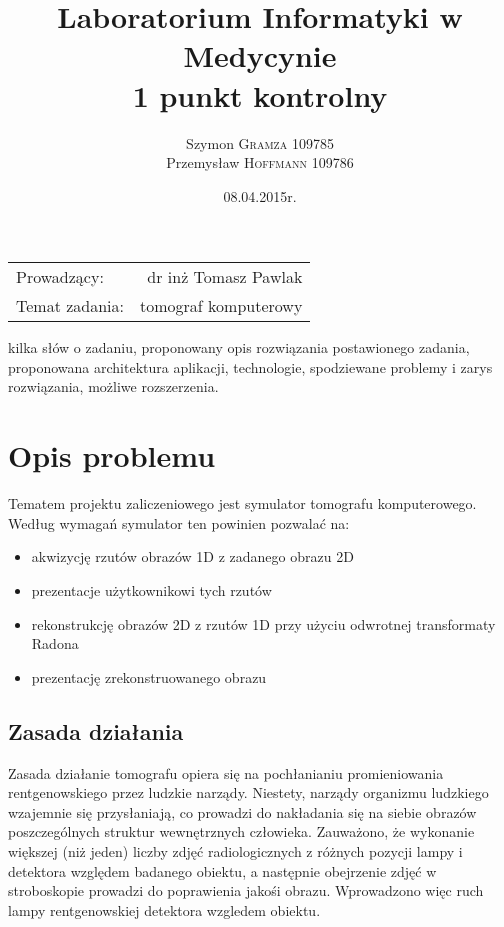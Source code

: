 \documentclass[A_4paper,12pt]{article}
\title{Laboratorium Informatyki w Medycynie \\ 1 punkt kontrolny} %
\author{Szymon \textsc{Gramza} 109785  \\ Przemysław \textsc{Hoffmann} 109786} %
\date{08.04.2015r.} %
\begin{document}
\maketitle %

\begin{center}
\begin{tabular}{l r}
Prowadzący: & dr inż Tomasz Pawlak \\
Temat zadania: & tomograf komputerowy
\end{tabular}
\end{center}

\newpage
 kilka słów o zadaniu, proponowany opis rozwiązania postawionego zadania, 
 proponowana architektura aplikacji, technologie, 
 spodziewane problemy i zarys rozwiązania, możliwe rozszerzenia.
 
\section{Opis problemu}
Tematem projektu zaliczeniowego jest symulator tomografu komputerowego.
Według wymagań symulator ten powinien pozwalać na:
\begin{itemize}
\item akwizycję rzutów obrazów 1D z zadanego obrazu 2D
\item prezentacje użytkownikowi tych rzutów
\item rekonstrukcję obrazów 2D z rzutów 1D przy użyciu odwrotnej transformaty Radona
\item prezentację zrekonstruowanego obrazu
\end{itemize}

\subsection{Zasada działania}
Zasada działanie tomografu opiera się na pochłanianiu promieniowania rentgenowskiego przez ludzkie narządy.
Niestety, narządy organizmu ludzkiego wzajemnie się przysłaniają, co prowadzi do nakładania się na siebie obrazów poszczególnych struktur wewnętrznych człowieka.
Zauważono, że wykonanie większej (niż jeden) liczby zdjęć radiologicznych z różnych pozycji lampy i detektora względem badanego obiektu, a następnie obejrzenie zdjęć w stroboskopie prowadzi do poprawienia jakośi obrazu. Wprowadzono więc ruch lampy rentgenowskiej detektora wzgledem obiektu.
\end{document}

